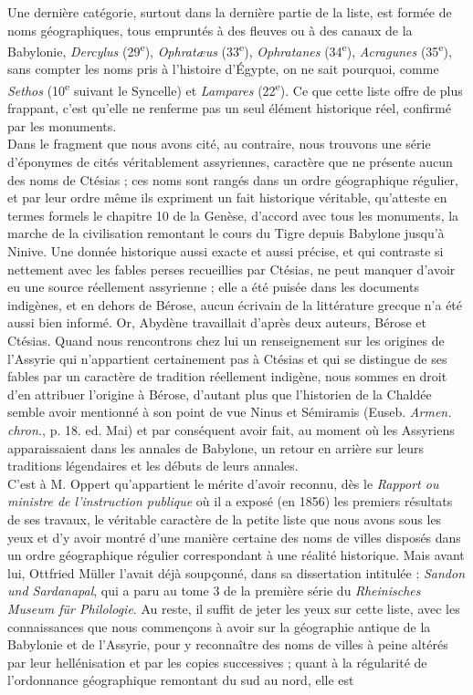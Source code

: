 \documentclass[a4paper, 11pt, oneside]{article}
\begin{document}
Une dernière catégorie, surtout dans la dernière partie de la liste, est formée de noms géographiques, tous empruntés à des fleuves ou à des canaux de la Babylonie, \emph{Dercylus} (29\textsuperscript{e}), \emph{Ophratæus} (33\textsuperscript{e}), \emph{Ophratanes} (34\textsuperscript{e}), \emph{Acragunes} (35\textsuperscript{e}), sans compter les noms pris à l'histoire d'Égypte, on ne sait pourquoi, comme \emph{Sethos} (10\textsuperscript{e} suivant le Syncelle) et \emph{Lampares} (22\textsuperscript{e}). Ce que cette liste offre de plus frappant, c'est qu'elle ne renferme pas un seul élément historique réel, confirmé par les monuments.\\\hspace*{5mm}Dans le fragment que nous avons cité, au contraire, nous trouvons une série d'éponymes de cités véritablement assyriennes, caractère que ne présente aucun des noms de Ctésias ; ces noms sont rangés dans un ordre géographique régulier, et par leur ordre même ils expriment un fait historique véritable, qu'atteste en termes formels le chapitre 10 de la Genèse, d'accord avec tous les monuments, la marche de la civilisation remontant le cours du Tigre depuis Babylone jusqu'à Ninive. Une donnée historique aussi exacte et aussi précise, et qui contraste si nettement avec les fables perses recueillies par Ctésias, ne peut manquer d'avoir eu une source réellement assyrienne ; elle a été puisée dans les documents indigènes, et en dehors de Bérose, aucun écrivain de la littérature grecque n'a été aussi bien informé. Or, Abydène travaillait d'après deux auteurs, Bérose et Ctésias. Quand nous rencontrons chez lui un renseignement sur les origines de l'Assyrie qui n'appartient certainement pas à Ctésias et qui se distingue de ses fables par un caractère de tradition réellement indigène, nous sommes en droit d'en attribuer l'origine à Bérose, d'autant plus que l'historien de la Chaldée semble avoir mentionné à son point de vue Ninus et Sémiramis (Euseb. \emph{Armen. chron.}, p. 18. ed. Mai) et par conséquent avoir fait, au moment où les Assyriens apparaissaient dans les annales de Babylone, un retour en arrière sur leurs traditions légendaires et les débuts de leurs annales.\\\hspace*{5mm}C'est à M. Oppert qu'appartient le mérite d'avoir reconnu, dès le \emph{Rapport ou ministre de l'instruction publique} où il a exposé (en 1856) les premiers résultats de ses travaux, le véritable caractère de la petite liste que nous avons sous les yeux et d'y avoir montré d'une manière certaine des noms de villes disposés dans un ordre géographique régulier correspondant à une réalité historique. Mais avant lui, Ottfried Müller l'avait déjà soupçonné, dans sa dissertation intitulée : \emph{Sandon und Sardanapal}, qui a paru au tome 3 de la première série du \emph{Rheinisches Museum für Philologie}. Au reste, il suffit de jeter les yeux sur cette liste, avec les connaissances que nous commençons à avoir sur la géographie antique de la Babylonie et de l'Assyrie, pour y reconnaître des noms de villes à peine altérés par leur hellénisation et par les copies successives ; quant à la régularité de l'ordonnance géographique remontant du sud au nord, elle est 
\end{document}
